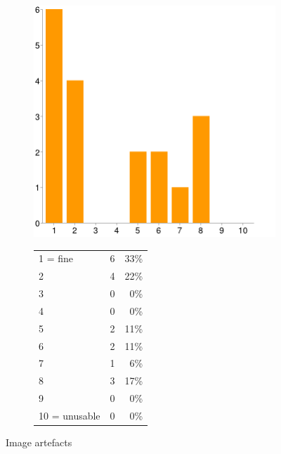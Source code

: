 \documentclass[MSc,paper=a4,pagesize=auto]{icldt}
\begin{document}
\begin{figure}[htbp!]
\centering
\begin{subfigure}{0.4\textwidth}
    \centering
    \includegraphics[width=1\linewidth]{resources/14-image_artefacts}
\end{subfigure}%
\centering
\begin{subfigure}{0.5\textwidth}
    \centering
   	\begin{tabular}{ l c r }
1 = fine&6&33\% \\
2&4&22\% \\
3&0&0\% \\
4&0&0\% \\
5&2&11\% \\
6&2&11\% \\
7&1&6\% \\
8&3&17\% \\
9&0&0\% \\
10 = unusable&0&0\% \\
\end{tabular}
\end{subfigure} 
    \caption{Image artefacts}
    \label{fig:14-image_artefacts}
\end{figure}
\end{document}
